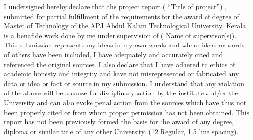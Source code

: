 I undersigned hereby declare that the project report ( “Title of project”) , submitted for partial fulfillment of the requirements for the award of degree of Master of Technology of the APJ Abdul Kalam Technological University, Kerala is a bonafide work done by me under supervision of ( Name of supervisor(s)). This submission represents my ideas in my own words and where ideas or words of others have been included, I have adequately and accurately cited and referenced the original sources. I also declare that I have adhered to ethics of academic honesty and integrity and have not misrepresented or fabricated any data or idea or fact or source in my submission. I understand that any violation of the above will be a cause for disciplinary action by the institute and/or the University and can also evoke penal action from the sources which have thus not been properly cited or from whom proper permission has not been obtained. This report has not been previously formed the basis for the award of any degree, diploma or similar title of any other University. (12 Regular, 1.5 line spacing).
